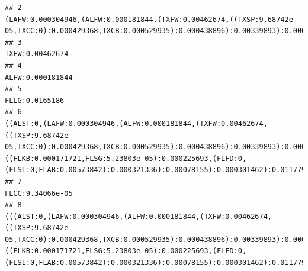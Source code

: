 \documentclass[]{article}
\begin{document}
\begin{verbatim}
## 2                                                                                                                                                                                                                                                    (LAFW:0.000304946,(ALFW:0.000181844,(TXFW:0.00462674,((TXSP:9.68742e-05,TXCC:0):0.000429368,TXCB:0.000529935):0.000438896):0.00339893):0.000450879):0.000633288
## 3                                                                                                                                                                                                                                                                                                                                                                                                    TXFW:0.00462674
## 4                                                                                                                                                                                                                                                                                                                                                                                                   ALFW:0.000181844
## 5                                                                                                                                                                                                                                                                                                                                                                                                     FLLG:0.0165186
## 6                                                                                             ((ALST:0,(LAFW:0.000304946,(ALFW:0.000181844,(TXFW:0.00462674,((TXSP:9.68742e-05,TXCC:0):0.000429368,TXCB:0.000529935):0.000438896):0.00339893):0.000450879):0.000633288):0.00274534,((FLKB:0.000171721,FLSG:5.23803e-05):0.000225693,(FLFD:0,(FLSI:0,FLAB:0.00573842):0.000321336):0.00078155):0.000301462):0.0117792
## 7                                                                                                                                                                                                                                                                                                                                                                                                   FLCC:9.34066e-05
## 8                                                                (((ALST:0,(LAFW:0.000304946,(ALFW:0.000181844,(TXFW:0.00462674,((TXSP:9.68742e-05,TXCC:0):0.000429368,TXCB:0.000529935):0.000438896):0.00339893):0.000450879):0.000633288):0.00274534,((FLKB:0.000171721,FLSG:5.23803e-05):0.000225693,(FLFD:0,(FLSI:0,FLAB:0.00573842):0.000321336):0.00078155):0.000301462):0.0117792,FLLG:0.0165186):0.000474876

\end{verbatim}
\end{document}
